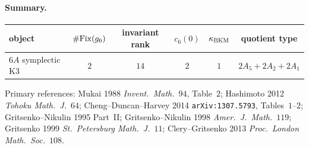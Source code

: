 \paragraph{Summary.}
\begin{center}
\footnotesize
\begin{tabular}{l|c|c|c|c|c}
object & $\#\mathrm{Fix}(g_6)$ & invariant rank & $c_6(0)$ & $\kappa_{\mathrm{BKM}}$ & quotient type\\
\midrule
$6A$ symplectic K3 & $2$ & $14$ & $2$ & $1$ & $2A_5+2A_2+2A_1$\\
\end{tabular}
\end{center}

Primary references: Mukai 1988 \emph{Invent.\ Math.}~$94$, Table~$2$;
Hashimoto 2012 \emph{Tohoku Math.\ J.}~$64$; Cheng--Duncan--Harvey 2014
\texttt{arXiv:1307.5793}, Tables~$1$--$2$; Gritsenko--Nikulin 1995
Part~II; Gritsenko--Nikulin 1998 \emph{Amer.\ J.\ Math.}~$119$;
Gritsenko 1999 \emph{St.\ Petersburg Math.\ J.}~$11$; Clery--Gritsenko
2013 \emph{Proc.\ London Math.\ Soc.}~$108$.
